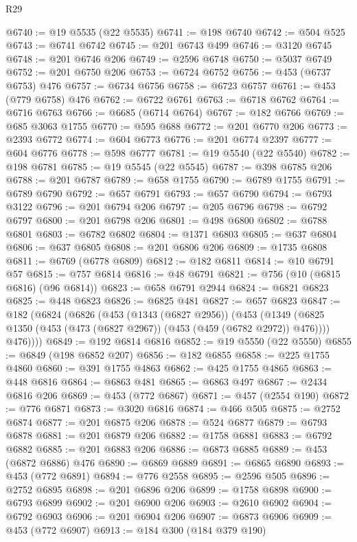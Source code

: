\begin{lexlean}{R29}
\begin{coremodule}
@6740 := @19 @5535 (@22 @5535)
@6741 := @198 @6740
@6742 := @504 @525
@6743 := @6741 @6742
@6745 := @201 @6743 @499
@6746 := @3120 @6745
@6748 := @201 @6746 @206
@6749 := @2596 @6748
@6750 := @5037 @6749
@6752 := @201 @6750 @206
@6753 := @6724 @6752
@6756 := @453 (@6737 @6753) @476
@6757 := @6734 @6756
@6758 := @6723 @6757
@6761 := @453 (@779 @6758) @476
@6762 := @6722 @6761
@6763 := @6718 @6762
@6764 := @6716 @6763
@6766 := @6685 (@6714 @6764)
@6767 := @182 @6766
@6769 := @685 @3063 @1755
@6770 := @595 @688
@6772 := @201 @6770 @206
@6773 := @2393 @6772
@6774 := @604 @6773
@6776 := @201 @6774 @2397
@6777 := @604 @6776
@6778 := @598 @6777
@6781 := @19 @5540 (@22 @5540)
@6782 := @198 @6781
@6785 := @19 @5545 (@22 @5545)
@6787 := @398 @6785 @206
@6788 := @201 @6787
@6789 := @658 @1755
@6790 := @6789 @1755
@6791 := @6789 @6790
@6792 := @657 @6791
@6793 := @657 @6790
@6794 := @6793 @3122
@6796 := @201 @6794 @206
@6797 := @205 @6796
@6798 := @6792 @6797
@6800 := @201 @6798 @206
@6801 := @498 @6800
@6802 := @6788 @6801
@6803 := @6782 @6802
@6804 := @1371 @6803
@6805 := @637 @6804
@6806 := @637 @6805
@6808 := @201 @6806 @206
@6809 := @1735 @6808
@6811 := @6769 (@6778 @6809)
@6812 := @182 @6811
@6814 := @10 @6791 @57
@6815 := @757 @6814
@6816 := @48 @6791
@6821 := @756 (@10 (@6815 @6816) (@96 @6814))
@6823 := @658 @6791 @2944
@6824 := @6821 @6823
@6825 := @448 @6823
@6826 := @6825 @481
@6827 := @657 @6823
@6847 := @182
    (@6824
      (@6826
        (@453
          (@1343 (@6827 @2956))
          (@453
            (@1349 (@6825 @1350 (@453 (@473 (@6827 @2967)) (@453 (@459 (@6782 @2972)) @476))))
            @476))))
@6849 := @192 @6814 @6816
@6852 := @19 @5550 (@22 @5550)
@6855 := @6849 (@198 @6852 @207)
@6856 := @182 @6855
@6858 := @225 @1755 @4860
@6860 := @391 @1755 @4863
@6862 := @425 @1755 @4865
@6863 := @448 @6816
@6864 := @6863 @481
@6865 := @6863 @497
@6867 := @2434 @6816 @206
@6869 := @453 (@772 @6867)
@6871 := @457 (@2554 @190)
@6872 := @776 @6871
@6873 := @3020 @6816
@6874 := @466 @505
@6875 := @2752 @6874
@6877 := @201 @6875 @206
@6878 := @524 @6877
@6879 := @6793 @6878
@6881 := @201 @6879 @206
@6882 := @1758 @6881
@6883 := @6792 @6882
@6885 := @201 @6883 @206
@6886 := @6873 @6885
@6889 := @453 (@6872 @6886) @476
@6890 := @6869 @6889
@6891 := @6865 @6890
@6893 := @453 (@772 @6891)
@6894 := @776 @2558
@6895 := @2596 @505
@6896 := @2752 @6895
@6898 := @201 @6896 @206
@6899 := @1758 @6898
@6900 := @6793 @6899
@6902 := @201 @6900 @206
@6903 := @2610 @6902
@6904 := @6792 @6903
@6906 := @201 @6904 @206
@6907 := @6873 @6906
@6909 := @453 (@772 @6907)
@6913 := @184 @300 (@184 @379 @190)

\end{coremodule}
\end{lexlean}
